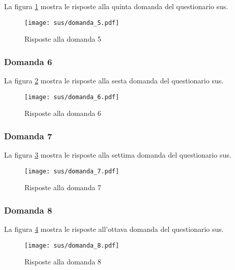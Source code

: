 \vspace{5pt}
\begin{minipage}{\textwidth}
  \par\noindent La figura \ref{fig:sus_q5} mostra le risposte alla quinta domanda del questionario \gls{sus}.
  \begin{figure}[H]
    \centering
    \texttt{[image: sus/domanda\_5.pdf]}
    \caption{Risposte alla domanda 5}
    \label{fig:sus_q5}
  \end{figure}
\end{minipage}

\subsubsection*{Domanda 6}

\vspace{5pt}
\begin{minipage}{\textwidth}
  \par\noindent La figura \ref{fig:sus_q6} mostra le risposte alla sesta domanda del questionario \gls{sus}.
  \begin{figure}[H]
    \centering
    \texttt{[image: sus/domanda\_6.pdf]}
    \caption{Risposte alla domanda 6}
    \label{fig:sus_q6}
  \end{figure}
\end{minipage}

\subsubsection*{Domanda 7}

\vspace{5pt}
\begin{minipage}{\textwidth}
  \par\noindent La figura \ref{fig:sus_q7} mostra le risposte alla settima domanda del questionario \gls{sus}.
  \begin{figure}[H]
    \centering
    \texttt{[image: sus/domanda\_7.pdf]}
    \caption{Risposte alla domanda 7}
    \label{fig:sus_q7}
  \end{figure}
\end{minipage}

\subsubsection*{Domanda 8}

\vspace{5pt}
\begin{minipage}{\textwidth}
  \par\noindent La figura \ref{fig:sus_q8} mostra le risposte all'ottava domanda del questionario \gls{sus}.
  \begin{figure}[H]
    \centering
    \texttt{[image: sus/domanda\_8.pdf]}
    \caption{Risposte alla domanda 8}
    \label{fig:sus_q8}
  \end{figure}
\end{minipage}

